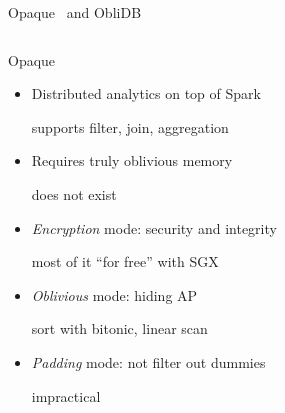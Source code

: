 		\begin{frame}{Opaque~\cite{opaque} and ObliDB~\cite{oblidb}}

			\begin{columns}[T,onlytextwidth]

					\begin{block}{Opaque~\cite{opaque}}

						\begin{itemize}
							\item Distributed analytics on top of Spark \\
							\begin{small}
								supports filter, join, aggregation
							\end{small}
							\item \alert{Requires truly oblivious memory} \\
								\begin{small}
									does not exist
								\end{small}
							\item \emph{Encryption} mode: security and integrity \\
								\begin{small}
									most of it ``for free'' with SGX
								\end{small}
							\item \emph{Oblivious} mode: hiding AP \\
								\begin{small}
									sort with bitonic, linear scan
								\end{small}
							\item \emph{Padding} mode: not filter out dummies \\
								\begin{small}
									impractical
								\end{small}
						\end{itemize}

					\end{block}


\end{columns}
\end{frame}
